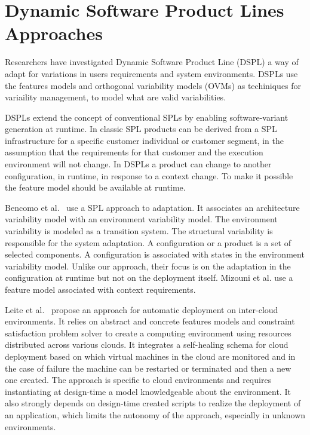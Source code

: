 \section{Dynamic Software Product Lines Approaches}
Researchers have investigated Dynamic Software Product Line (DSPL) a way of adapt for variations in users requirements and system environments. DSPLs use the features models and  orthogonal variability models (OVMs) as techiniques for variaility management, to model what are valid variabilities.

DSPLs extend the concept of conventional SPLs by enabling software-variant generation at runtime. In classic SPL products can be derived from a SPL infrastructure for a specific customer individual or customer segment, in the assumption that the requirements for that customer and the execution environment will not change. In DSPLs a product can change to another configuration, in runtime, in response to a context change. To make it possible the feature model should be available at runtime. \cite{bencomo_view_2012}

Bencomo et al.~\cite{bencomo_dynamically_2008} use a SPL approach to adaptation. It  associates an architecture variability model with an environment variability model. The environment variability is modeled as a transition system. The structural variability is responsible for the system adaptation. A configuration or a product is a set of selected components. A configuration is associated with states in the environment variability model. Unlike our approach, their focus is on the adaptation in the configuration at runtime but not on the deployment itself. Mizouni et al. \citep{mizouni_framework_2014} use a feature model associated with context requirements.

Leite et al.~\cite{ferreira_leite_user_2014} propose an approach for automatic deployment on inter-cloud environments. It relies on abstract and concrete features models and constraint satisfaction problem solver to create a computing environment using resources distributed across various clouds.
It integrates a self-healing schema for cloud deployment based on which virtual machines in the cloud are monitored and in the case of failure the machine can be
restarted or terminated and then a new one created.
The approach is specific to cloud environments and requires instantiating at design-time a model knowledgeable about the environment.
It also strongly depends on design-time created scripts to realize the deployment of an application, which limits the autonomy of the approach, especially in unknown environments.


